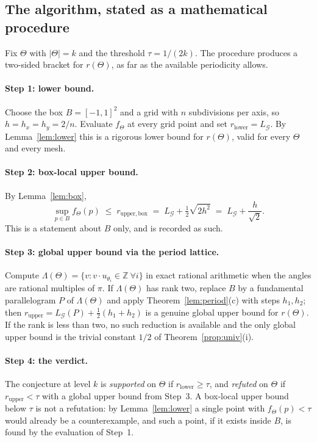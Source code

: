 \documentclass[11pt]{article}
\theoremstyle{plain}
\theoremstyle{definition}
\theoremstyle{remark}
\newcommand{\Z}{\mathbb{Z}}
\begin{document}
\subsection{The algorithm, stated as a mathematical procedure}

Fix $\Theta$ with $|\Theta|=k$ and the threshold $\tau=1/(2k)$. The procedure produces a two-sided
bracket for $r(\Theta)$, as far as the available periodicity allows.

\paragraph{Step 1: lower bound.} Choose the box $B=[-1,1]^2$ and a grid with $n$ subdivisions per axis,
so $h=h_x=h_y=2/n$. Evaluate $f_\Theta$ at every grid point and set
$r_{\mathrm{lower}}=L_{\mathcal{G}}$. By Lemma~\ref{lem:lower} this is a rigorous lower bound for
$r(\Theta)$, valid for every $\Theta$ and every mesh.

\paragraph{Step 2: box-local upper bound.} By Lemma~\ref{lem:box},
\[
\sup_{p\in B}f_\Theta(p)\;\le\;r_{\mathrm{upper,box}}
\;=\;L_{\mathcal{G}}+\tfrac12\sqrt{2h^{2}}
\;=\;L_{\mathcal{G}}+\frac{h}{\sqrt2}.
\]
This is a statement about $B$ only, and is recorded as such.

\paragraph{Step 3: global upper bound via the period lattice.} Compute
$\Lambda(\Theta)=\{v : v\cdot u_{\theta_i}\in\Z\ \forall i\}$ in exact rational arithmetic when the
angles are rational multiples of $\pi$. If $\Lambda(\Theta)$ has rank two, replace $B$ by a fundamental
parallelogram $P$ of $\Lambda(\Theta)$ and apply Theorem~\ref{lem:period}(c) with steps $h_1,h_2$; then
$r_{\mathrm{upper}}=L_{\mathcal{G}}(P)+\tfrac12(h_1+h_2)$ is a genuine global upper bound for
$r(\Theta)$. If the rank is less than two, no such reduction is available and the only global upper
bound is the trivial constant $1/2$ of Theorem~\ref{prop:univ}(i).

\paragraph{Step 4: the verdict.} The conjecture at level $k$ is \emph{supported} on $\Theta$ if
$r_{\mathrm{lower}}\ge\tau$, and \emph{refuted} on $\Theta$ if $r_{\mathrm{upper}}<\tau$ with a global
upper bound from Step~3. A box-local upper bound below $\tau$ is not a refutation: by
Lemma~\ref{lem:lower} a single point with $f_\Theta(p)<\tau$ would already be a counterexample, and
such a point, if it exists inside $B$, is found by the evaluation of Step~1.
\end{document}
